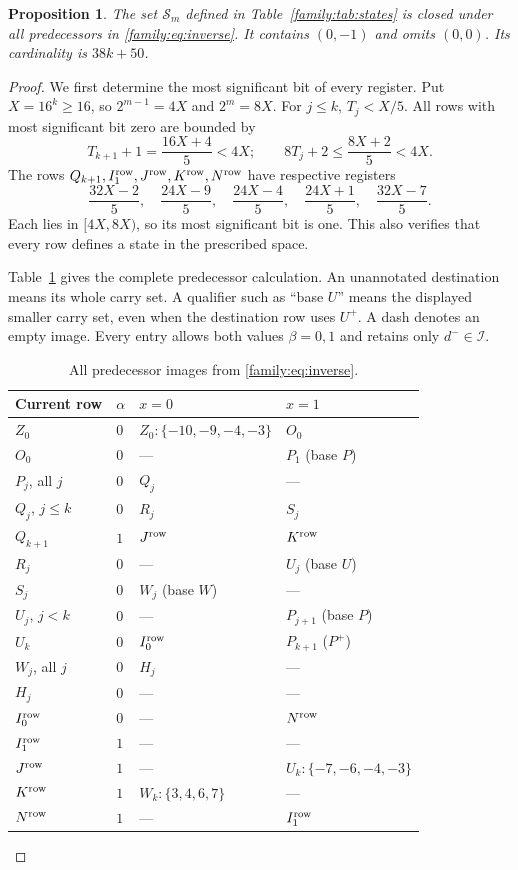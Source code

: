 \documentclass[11pt]{article}
\newtheorem{proposition}[theorem]{Proposition}
\theoremstyle{remark}
\newcommand{\I}{\mathcal I}
\newcommand{\Sc}{\mathcal S}
\begin{document}
\begin{proposition}\label{family:prop:certificate}
The set $\Sc_m$ defined in Table~\ref{family:tab:states} is closed under all
predecessors in \eqref{family:eq:inverse}. It contains $(0,-1)$ and omits
$(0,0)$. Its cardinality is $38k+50$.
\end{proposition}
\begin{proof}
We first determine the most significant bit of every register.
Put $X=16^k\ge16$, so $2^{m-1}=4X$ and $2^m=8X$.
For $j\le k$, $T_j<X/5$. All rows with most significant bit zero
are bounded by
\[
 T_{k+1}+1=\frac{16X+4}{5}<4X;
 \qquad 8T_j+2\le\frac{8X+2}{5}<4X.
\]
The rows $Q_{k+1},I_1^{\rm row},J^{\rm row},K^{\rm row},N^{\rm row}$
have respective registers
\[
 \frac{32X-2}{5},\quad \frac{24X-9}{5},\quad
 \frac{24X-4}{5},\quad \frac{24X+1}{5},\quad \frac{32X-7}{5}.
\]
Each lies in $[4X,8X)$, so its most significant bit is one. This
also verifies that every row defines a state in the prescribed space.

Table~\ref{family:tab:inverse} gives the complete predecessor calculation.
An unannotated destination means its whole carry set. A qualifier
such as ``base $U$'' means the displayed smaller carry set, even
when the destination row uses $U^+$. A dash denotes an empty image.
Every entry allows both values $\beta=0,1$ and retains only
$d^-\in\I$.

\begin{table}[htbp]
\centering\small
\caption{All predecessor images from \eqref{family:eq:inverse}.}
\label{family:tab:inverse}
\begin{tabular}{llll}
\toprule
Current row & $\alpha$ & $x=0$ & $x=1$\\
\midrule
$Z_0$ & $0$ & $Z_0:\{-10,-9,-4,-3\}$ & $O_0$\\
$O_0$ & $0$ & --- & $P_1$ (base $P$)\\
$P_j$, all $j$ & $0$ & $Q_j$ & ---\\
$Q_j$, $j\le k$ & $0$ & $R_j$ & $S_j$\\
$Q_{k+1}$ & $1$ & $J^{\rm row}$ & $K^{\rm row}$\\
$R_j$ & $0$ & --- & $U_j$ (base $U$)\\
$S_j$ & $0$ & $W_j$ (base $W$) & ---\\
$U_j$, $j<k$ & $0$ & --- & $P_{j+1}$ (base $P$)\\
$U_k$ & $0$ & $I_0^{\rm row}$ & $P_{k+1}$ ($P^+$)\\
$W_j$, all $j$ & $0$ & $H_j$ & ---\\
$H_j$ & $0$ & --- & ---\\
$I_0^{\rm row}$ & $0$ & --- & $N^{\rm row}$\\
$I_1^{\rm row}$ & $1$ & --- & ---\\
$J^{\rm row}$ & $1$ & --- & $U_k:\{-7,-6,-4,-3\}$\\
$K^{\rm row}$ & $1$ & $W_k:\{3,4,6,7\}$ & ---\\
$N^{\rm row}$ & $1$ & --- & $I_1^{\rm row}$\\
\bottomrule
\end{tabular}
\end{table}


\end{proof}
\end{document}
